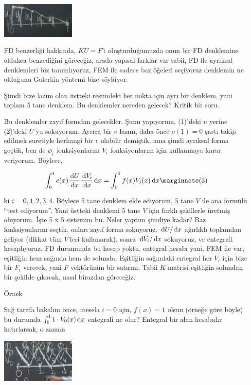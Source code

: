 \documentclass[12pt,fleqn]{article}\usepackage{../../common}
\begin{document}
\includegraphics[width=10em]{compscieng_1_18_04.png}

FD benzerliği hakkında, $KU=F$'i oluşturduğumuzda onun bir FD denklemine oldukca
benzediğini göreceğiz, arada yapısal farklar var tabii, FD ile ayrıksal
denklemleri biz tanımlıyoruz, FEM ile sadece baz öğeleri seçiyoruz denklemin
ne olduğunu Galerkin yöntemi bize söylüyor.

Şimdi bize lazım olan üstteki resimdeki her nokta için ayrı bir denklem, yani
toplam 5 tane denklem. Bu denklemler nereden gelecek? Kritik bir soru.

Bu denklemler zayıf formdan gelecekler. Şunu yapıyorum, (1)'deki $u$ yerine
(2)'deki $U$'yu sokuyorum. Ayrıca bir $v$ lazım, daha önce $v(1)=0$ şartı takip
edilmek suretiyle herhangi bir $v$ olabilir demiştik, ama şimdi ayrıksal forma
geçtik, ben de $\phi_i$ fonksiyonlarını $V_i$ fonksiyonlarım için kullanmaya
karar veriyorum. Böylece,

$$
\int _{0}^{1} c(x) \frac{\ud U}{\ud x} \frac{\ud V_i}{\ud x} \ud x =
\int _{0}^{1} f(x) V_i(x) \ud x
\mlabel{3}
$$

ki $i=0,1,2,3,4$. Böylece 5 tane denklem elde ediyorum, 5 tane $V$ ile ana
formülü ``test ediyorum''. Yani üstteki denklemi 5 tane $V$ için farklı
şekillerle üretmiş oluyorum. İşte 5 x 5 sistemim bu. Neler yaptım şimdiye kadar?
Baz fonksiyonlarını seçtik, onları zayıf forma sokuyoruz. $\,\mathrm{d} U / \,\mathrm{d} x$
ağırlıklı toplamdan geliyor (dikkat tüm $V$'leri kullanarak), sonra
$\,\mathrm{d} V_i / \,\mathrm{d} x$ sokuyoruz, ve entegrali hesaplıyoruz. FD durumunda bu
hesap yoktu, entegral hesabı yani, FEM ile var, eşitliğin hem sağında hem de
solunda.  Eşitliğin sağındaki entegral her $V_i$ için bize bir $F_i$ verecek,
yani $F$ vektörünün bir satırını. Tabii $K$ matrisi eşitliğin solundan
bir şekilde çıkacak, nasıl birazdan göreceğiz.

Örnek

Sağ tarafa bakalım önce, mesela $i=0$ için, $f(x)=1$ olsun (örneğe göre
böyle) bu durumda $\int_{0}^{1} 1 \cdot V_0(x) \,\mathrm{d} x$ entegrali ne
olur? Entegral bir alan hesabıdır hatırlarsak, o zaman 

\includegraphics[width=10em]{compscieng_1_18_05.png}
\end{document}
